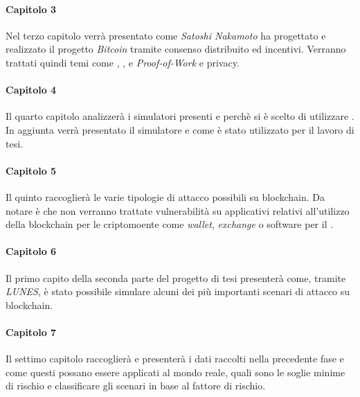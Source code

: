 \paragraph{Capitolo 3}
Nel terzo capitolo verrà presentato come \textit{Satoshi Nakamoto} ha progettato e realizzato il progetto \textit{Bitcoin} tramite consenso distribuito ed incentivi. Verranno trattati quindi temi come , ,  e \textit{Proof-of-Work} e privacy.

\paragraph{Capitolo 4}
Il quarto capitolo analizzerà i simulatori presenti e perchè si è scelto di utilizzare .
In aggiunta verrà presentato il simulatore e come è stato utilizzato per il lavoro di tesi.

\paragraph{Capitolo 5}
Il quinto raccoglierà le varie tipologie di attacco possibili su blockchain. Da notare è che non verranno trattate vulnerabilità su applicativi relativi all'utilizzo della blockchain per le criptomoente come \textit{wallet}, \textit{exchange} o software per il .

\paragraph{Capitolo 6}
Il primo capito della seconda parte del progetto di tesi presenterà come, tramite \textit{LUNES}, è stato possibile simulare alcuni dei più importanti scenari di attacco su blockchain.

\paragraph{Capitolo 7}
Il settimo capitolo raccoglierà e presenterà i dati raccolti nella precedente fase e come questi possano essere applicati al mondo reale, quali sono le soglie minime di rischio e classificare gli scenari in base al fattore di rischio.


